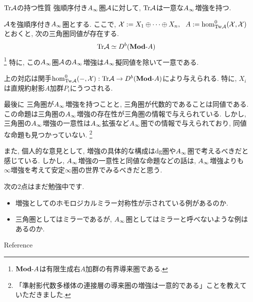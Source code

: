 \documentclass[aspectratio=169, dvipdfmx, 8pt, notheorems, uplatex]{beamer}
\begin{document}
\begin{frame}{$\mathrm{Tr}\mathcal{A}$の持つ性質}
  強順序付き$A_\infty$圏$\mathcal{A}$に対して, $\mathrm{Tr}\mathcal{A}$は一意な$A_\infty$増強を持つ. 

  \begin{theorem}
    $\mathcal{A}$を強順序付き$A_\infty$圏とする.
    ここで, $\mathcal{X} := X_1 \oplus \cdots \oplus X_n, ~~ A := \hom^0_{\mathrm{Tw}\mathcal{A}}(\mathcal{X},\mathcal{X})$とおくと, 次の三角圏同値が存在する. 
    \begin{align*}
      \mathrm{Tr}\mathcal{A} \simeq D^b(\mathbf{Mod}\text{-}A)
    \end{align*}
    \footnote{
      $\mathbf{Mod}\text{-}A$は有限生成右$A$加群の有界導来圏である. 
    }
    特に, この$A_\infty$圏$\mathcal{A}$の$A_\infty$増強は$A_\infty$擬同値を除いて一意である. 
  \end{theorem}

  \begin{remark}
    上の対応は関手$\hom^0_{\mathrm{Tw}\mathcal{A}}(-,\mathcal{X}) : \mathrm{Tr}\mathcal{A} \to D^b(\mathbf{Mod}\text{-}A)$により与えられる. 
    特に, $X_i$は直規約射影$A$加群$P_i$にうつされる.
  \end{remark}
\end{frame}

\begin{frame}{最後に}
  三角圏が$A_\infty$増強を持つことと, 三角圏が代数的であることは同値である. 
  この命題は三角圏の$A_\infty$増強の存在性が三角圏の情報で与えられている.
  しかし, 三角圏の$A_\infty$増強の一意性は$A_\infty$拡張など$A_\infty$圏での情報で与えられており, 同値な命題も見つかっていない.
  \footnote{
    「準射影代数多様体の連接層の導来圏の増強は一意的である」ことを教えていただきました. 
  }
  \bigskip
  
  また, 個人的な意見として, 増強の具体的な構成はdg圏や$A_\infty$圏で考えるべきだと感じている. 
  しかし, $A_\infty$増強の一意性と同値な命題などの話は, $A_\infty$増強よりも$\infty$増強を考えて安定$\infty$圏の世界でみるべきだと思う. \bigskip

  次の2点はまだ勉強中です. 
  \begin{itemize}
    \item 増強としてのホモロジカルミラー対称性が示されている例があるのか.
    \item 三角圏としてはミラーであるが, $A_\infty$圏としてはミラーと呼べないような例はあるのか. 
  \end{itemize}
\end{frame}


\begin{frame}[allowframebreaks]{Reference}
  \scriptsize
  \beamertemplatetextbibitems
  
  
\end{frame}
\end{document}
